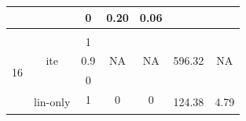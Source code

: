 \begin{table}[]
\begin{tabular}{ccccccc}
\multicolumn{1}{|c|}{}                         & \multicolumn{1}{c|}{}                               & \multicolumn{1}{c|}{0}                  & \multicolumn{1}{c|}{0.20}                & \multicolumn{1}{c|}{0.06}                & \multicolumn{1}{c|}{}                                                                    & \multicolumn{1}{c|}{}                                                                          \\ \hline
\multicolumn{1}{l}{}                           & \multicolumn{1}{l}{}                                & \multicolumn{1}{l}{}                    & \multicolumn{1}{l}{}                     & \multicolumn{1}{l}{}                     & \multicolumn{1}{l}{}                                                                     & \multicolumn{1}{l}{}                                                                           \\ \hline
\multicolumn{1}{|c|}{\multirow{9}{*}{16}}      & \multicolumn{1}{c|}{\multirow{3}{*}{ite}}           & \multicolumn{1}{c|}{1}                  & \multicolumn{1}{c|}{\multirow{3}{*}{NA}} & \multicolumn{1}{c|}{\multirow{3}{*}{NA}} & \multicolumn{1}{c|}{\multirow{3}{*}{596.32}}                                             & \multicolumn{1}{c|}{\multirow{3}{*}{NA}}                                                       \\ \cline{3-3}
\multicolumn{1}{|c|}{}                         & \multicolumn{1}{c|}{}                               & \multicolumn{1}{c|}{0.9}                & \multicolumn{1}{c|}{}                    & \multicolumn{1}{c|}{}                    & \multicolumn{1}{c|}{}                                                                    & \multicolumn{1}{c|}{}                                                                          \\ \cline{3-3}
\multicolumn{1}{|c|}{}                         & \multicolumn{1}{c|}{}                               & \multicolumn{1}{c|}{0}                  & \multicolumn{1}{c|}{}                    & \multicolumn{1}{c|}{}                    & \multicolumn{1}{c|}{}                                                                    & \multicolumn{1}{c|}{}                                                                          \\ \cline{2-7} 
\multicolumn{1}{|c|}{}                         & \multicolumn{1}{c|}{\multirow{3}{*}{lin-only}}      & \multicolumn{1}{c|}{1}                  & \multicolumn{1}{c|}{0}                   & \multicolumn{1}{c|}{0}                   & \multicolumn{1}{c|}{\multirow{3}{*}{124.38}}                                             & \multicolumn{1}{c|}{\multirow{3}{*}{4.79}}                                                     \\ \cline{3-5}

\end{tabular}
\end{table}
